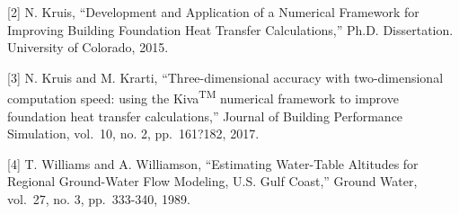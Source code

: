 {[}2{]} N. Kruis, ``Development and Application of a Numerical Framework for Improving Building Foundation Heat Transfer Calculations,''
Ph.D. Dissertation. University of Colorado, 2015.

{[}3{]} N. Kruis and M. Krarti, ``Three-dimensional accuracy with
two-dimensional computation speed: using the Kiva\textsuperscript{TM}
numerical framework to improve foundation heat transfer calculations,''
Journal of Building Performance Simulation, vol.~10, no. 2, pp.~161?182,
2017.

{[}4{]} T. Williams and A. Williamson, ``Estimating Water-Table
Altitudes for Regional Ground-Water Flow Modeling, U.S. Gulf Coast,''
Ground Water, vol.~27, no. 3, pp.~333-340, 1989.
